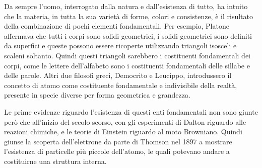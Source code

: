 \documentclass[../main.tex]{subfiles}
\begin{document}
Da sempre l'uomo, interrogato dalla natura e dall'esistenza di tutto, ha intuito che la materia, in tutta la sua varietà di forme, colori e consistenze, è il risultato della combinazione di pochi elementi fondamentali. Per esempio, Platone affermava che tutti i corpi sono solidi geometrici, i solidi geometrici sono definiti da superfici e queste possono essere ricoperte utilizzando triangoli isosceli e scaleni soltanto. Quindi questi triangoli sarebbero i costituenti fondamentali dei corpi, come le lettere dell'alfabeto sono i costituenti fondamentali delle sillabe e delle parole. Altri due filosofi greci, Democrito e Leucippo, introdussero il concetto di atomo come costituente fondamentale e indivisibile della realtà, presente in specie diverse per forma geometrica e grandezza.

Le prime evidenze riguardo l'esistenza di questi enti fondamentali non sono giunte però che all'inizio del secolo scorso, con gli esperimenti di Dalton riguardo alle reazioni chimiche, e le teorie di Einstein riguardo al moto Browniano. Quindi giunse la scoperta dell'elettrone da parte di Thomson nel 1897 a mostrare l'esistenza di particelle più piccole dell'atomo, le quali potevano andare a costituirne una struttura interna.
\end{document}
